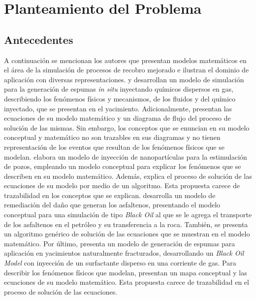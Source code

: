 

\chapter{Planteamiento del Problema}\label{cap:Antecedentes}
%
\section{Antecedentes}

A continuación se mencionan los autores que presentan modelos matemáticos en el área de la simulación de procesos de recobro mejorado e ilustran el dominio de aplicación con diversas representaciones. \cite{ValenciaJD2016} y  \cite{valencia2018development} desarrollan un modelo de simulación para la generación de espumas \textit{in situ} inyectando químicos dispersos en gas, describiendo los fenómenos físicos y mecanismos, de los fluidos y del químico inyectado, que se presentan en el yacimiento. Adicionalmente, presentan las ecuaciones de su modelo matemático y un diagrama de flujo del proceso de solución de las mismas. Sin embargo, los conceptos que se enuncian en su modelo conceptual y matemático no son trazables en sus diagramas y no tienen representación de los eventos que resultan de los fenómenos físicos que se modelan. \cite{MozoID2017} elabora un modelo de inyección de nanopartículas para la estimulación de pozos, empleando un modelo conceptual para explicar los fenómenos que se describen en su modelo matemático. Además, explica el proceso de solución de las ecuaciones de su modelo por medio de un algoritmo. Esta propuesta carece de trazabilidad en los conceptos que se explican. \cite{IsazaCN2017} desarrolla un modelo de remediación del daño que generan los asfaltenos, presentando el modelo conceptual para una simulación de tipo \textit{Black Oil} al que se le agrega el transporte de los asfaltenos en el petróleo y su transferencia a la roca. También, se presenta un algoritmo genérico de solución de las ecuaciones que se muestran en el modelo matemático. Por último, \cite{solano2019modeling} presenta un modelo de generación de espumas para aplicación en yacimientos naturalmente fracturados, desarrollando un \textit{Black Oil Model} con inyección de un surfactante disperso en una corriente de gas. Para describir los fenómenos físicos que \cite{solano2019modeling} modelan, presentan un mapa conceptual y las ecuaciones de su modelo matemático. Esta propuesta carece de trazabilidad en el proceso de solución de las ecuaciones.\\

